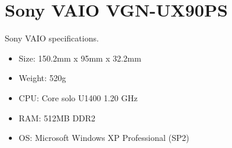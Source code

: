 \chapter{Sony VAIO VGN-UX90PS}
\label{AppendixA}

Sony VAIO specifications.

\begin{itemize}
\item Size: 150.2mm x 95mm x 32.2mm
\item Weight: 520g
\item CPU: Core solo U1400 1.20 GHz
\item RAM: 512MB DDR2
\item OS: Microsoft Windows XP Professional (SP2)
\end{itemize}
